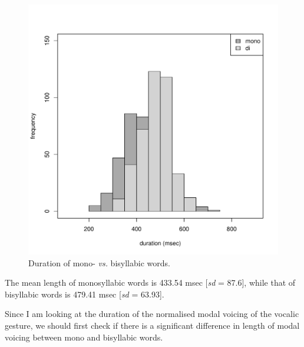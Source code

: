 \documentclass[a4paper,11pt]{article}\usepackage[]{graphicx}\usepackage[]{color}
\makeatletter
\def\maxwidth{ %
  \ifdim\Gin@nat@width>\linewidth
    \linewidth
  \else
    \Gin@nat@width
  \fi
}
\newenvironment{knitrout}{}{} %
\makeatother
\begin{document}
\begin{figure}
\begin{knitrout}
\color{fgcolor}
\includegraphics[width=\maxwidth]{img/word-duration-1} 

\end{knitrout}
\caption{Duration of mono- \textit{vs.} bisyllabic words.}
\end{figure}

The mean length of monosyllabic words is 433.54 msec [\textit{sd} = 87.6], while that of bisyllabic words is 479.41 msec [\textit{sd} = 63.93].

Since I am looking at the duration of the normalised modal voicing of the vocalic gesture, we should first check if there is a significant difference in length of modal voicing between mono and bisyllabic words.
\end{document}
